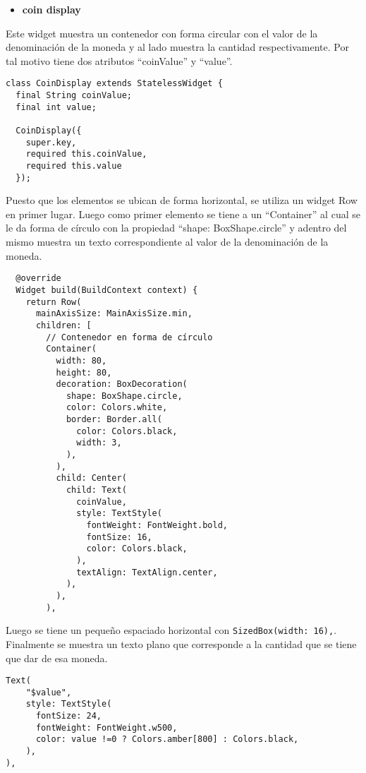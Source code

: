 \begin{itemize}
    \item \textbf{coin display}
\end{itemize}

Este widget muestra un contenedor con forma circular con el valor de la denominación de la moneda y al lado muestra la cantidad respectivamente. Por tal motivo tiene dos atributos “coinValue” y “value”.

\begin{center}
\begin{lstlisting}
class CoinDisplay extends StatelessWidget {
  final String coinValue;
  final int value;

  CoinDisplay({
    super.key,
    required this.coinValue,
    required this.value
  });
\end{lstlisting}
\end{center}

Puesto que los elementos se ubican de forma horizontal, se utiliza un widget Row en primer lugar. Luego como primer elemento se tiene a un “Container” al cual se le da forma de círculo con la propiedad “shape: BoxShape.circle” y adentro del mismo muestra un texto correspondiente al valor de la denominación de la moneda.

\begin{center}
\begin{lstlisting}
  @override
  Widget build(BuildContext context) {
    return Row(
      mainAxisSize: MainAxisSize.min,
      children: [
        // Contenedor en forma de círculo
        Container(
          width: 80,
          height: 80,
          decoration: BoxDecoration(
            shape: BoxShape.circle,
            color: Colors.white,
            border: Border.all(
              color: Colors.black,
              width: 3,
            ),
          ),
          child: Center(
            child: Text(
              coinValue,
              style: TextStyle(
                fontWeight: FontWeight.bold,
                fontSize: 16,
                color: Colors.black,
              ),
              textAlign: TextAlign.center,
            ),
          ),
        ),
\end{lstlisting}
\end{center}

Luego se tiene un pequeño espaciado horizontal con \lstinline{SizedBox(width: 16),}. Finalmente se muestra un texto plano que corresponde a la cantidad que se tiene que dar de esa moneda.

\begin{center}
\begin{lstlisting}
Text(
    "$value",
    style: TextStyle(
      fontSize: 24,
      fontWeight: FontWeight.w500,
      color: value !=0 ? Colors.amber[800] : Colors.black,
    ),
),
\end{lstlisting}
\end{center}

